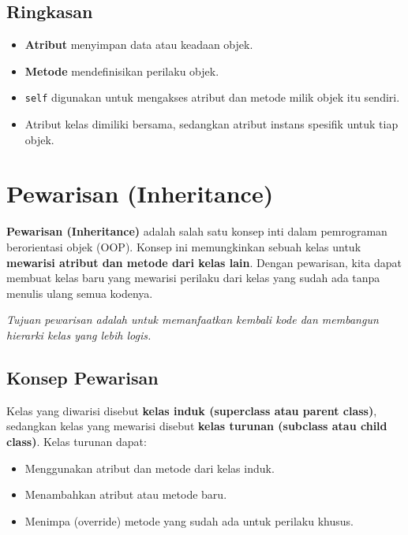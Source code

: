 \subsection*{Ringkasan}
\begin{itemize}
    \item \textbf{Atribut} menyimpan data atau keadaan objek.
    \item \textbf{Metode} mendefinisikan perilaku objek.
    \item \texttt{self} digunakan untuk mengakses atribut dan metode milik objek itu sendiri.
    \item Atribut kelas dimiliki bersama, sedangkan atribut instans spesifik untuk tiap objek.
\end{itemize}

\section{Pewarisan (Inheritance)}

\textbf{Pewarisan (Inheritance)} adalah salah satu konsep inti dalam pemrograman berorientasi objek (OOP).  
Konsep ini memungkinkan sebuah kelas untuk \textbf{mewarisi atribut dan metode dari kelas lain}.  
Dengan pewarisan, kita dapat membuat kelas baru yang mewarisi perilaku dari kelas yang sudah ada tanpa menulis ulang semua kodenya.

\begin{center}
\textit{Tujuan pewarisan adalah untuk memanfaatkan kembali kode dan membangun hierarki kelas yang lebih logis.}
\end{center}

\subsection{Konsep Pewarisan}

Kelas yang diwarisi disebut \textbf{kelas induk (superclass atau parent class)},  
sedangkan kelas yang mewarisi disebut \textbf{kelas turunan (subclass atau child class)}.  
Kelas turunan dapat:
\begin{itemize}
    \item Menggunakan atribut dan metode dari kelas induk.
    \item Menambahkan atribut atau metode baru.
    \item Menimpa (override) metode yang sudah ada untuk perilaku khusus.
\end{itemize}

